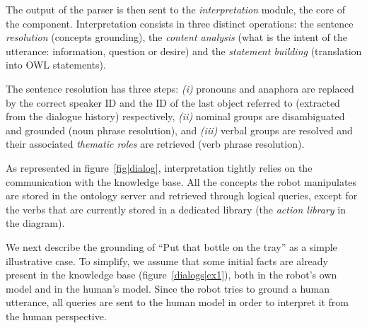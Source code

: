 \documentclass{svmult}
\begin{document}
The output of the parser is then sent to the \emph{interpretation} module, the
core of the component.  Interpretation consists in three distinct operations:
the sentence \emph{resolution} (concepts grounding), the \emph{content
analysis} (what is the intent of the utterance: information, question or
desire) and the \emph{statement building} (translation into OWL statements).

The sentence resolution has three steps: {\it(i)} pronouns and anaphora are
replaced by the correct speaker ID and the ID of the last object referred to
(extracted from the dialogue history) respectively, {\it(ii)} nominal groups are
disambiguated and grounded (noun phrase resolution), and {\it(iii)}
verbal groups are resolved and their associated \emph{thematic roles} are
retrieved (verb phrase resolution).

As represented in figure~\ref{fig|dialog}, interpretation tightly relies on the
communication with the knowledge base. All the concepts the robot manipulates
are stored in the ontology server and retrieved through logical
queries, except for the verbs that are currently stored in a dedicated library
(the \emph{action library} in the diagram).

We next describe the grounding of ``Put that bottle on the tray'' as a simple
illustrative case. To simplify, we assume that some initial facts are already
present in the knowledge base (figure~\ref{dialogs|ex1}), both in the robot's own
model and in the human's model.  Since the robot tries to ground a human
utterance, all queries are sent to the human model in order to interpret it
from the human perspective. 
\end{document}

